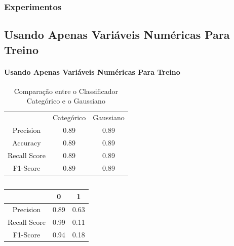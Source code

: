 \documentclass{beamer}
\begin{document}
\begin{frame}
    \frametitle{Experimentos}
    \subsection{Usando Apenas Variáveis Numéricas Para Treino}
    \framesubtitle{Usando Apenas Variáveis Numéricas Para Treino}
    \begin{table}[H]
        \centering
        \caption{\label{tab:cr3-gt} Comparação entre o Classificador Categórico e o Gaussiano}
        \begin{small}
            \begin{tabular}{ccc}
                \\
                \\
                \hline
                                        & Categórico       & Gaussiano\\
                \hline
                Precision               & 0.89             & 0.89\\
                Accuracy                & 0.89             & 0.89\\
                Recall Score            & 0.89             & 0.89\\
                F1-Score                & 0.89             & 0.89\\
                
                \hline
            \end{tabular}
        \end{small}
    \end{table}


        \begin{columns}
            \begin{column}{0.5\textwidth}
                \begin{table}[H]

                    \centering
                    \begin{small}
                        \begin{tabular}{ccc}
                        
                            \hline
                                                    & 0                & 1\\
                            \hline
                            Precision               & 0.89             & 0.63\\
                            Recall Score            & 0.99             & 0.11\\
                            F1-Score                & 0.94             & 0.18\\
                            

\end{tabular}
\end{small}
\end{table}
\end{column}
\end{columns}
\end{frame}
\end{document}
